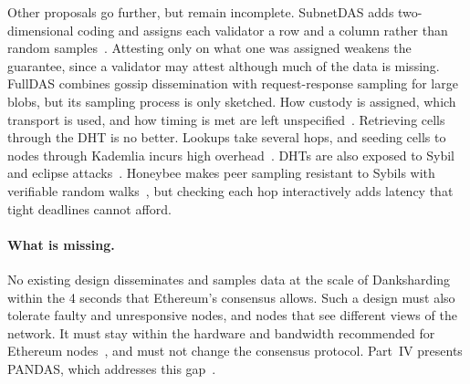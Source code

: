 Other proposals go further, but remain incomplete.
SubnetDAS adds two-dimensional coding and assigns each validator a row and a column rather than random samples~\cite{damato2023subnetdas}.
Attesting only on what one was assigned weakens the guarantee, since a validator may attest although much of the data is missing.
FullDAS combines gossip dissemination with request-response sampling for large blobs, but its sampling process is only sketched.
How custody is assigned, which transport is used, and how timing is met are left unspecified~\cite{kiraly2024fulldas}.
Retrieving cells through the DHT is no better.
Lookups take several hops, and seeding cells to nodes through Kademlia incurs high overhead~\cite{cortes2024kademlia}. 
DHTs are also exposed to Sybil and eclipse attacks~\cite{marcus2018eclipse,henningsen2019eclipsing}.
Honeybee makes peer sampling resistant to Sybils with verifiable random walks~\cite{zhang2024honeybee}, but checking each hop interactively adds latency that tight deadlines cannot afford. 

\paragraph{What is missing.}
No existing design disseminates and samples data at the scale of Danksharding within the 4 seconds that Ethereum's consensus allows.
Such a design must also tolerate faulty and unresponsive nodes, and nodes that see different views of the network.
It must stay within the hardware and bandwidth recommended for Ethereum nodes~\cite{eip7870}, and must not change the consensus protocol.
Part~IV presents PANDAS, which addresses this gap~\cite{pigaglio2025pandas}.
